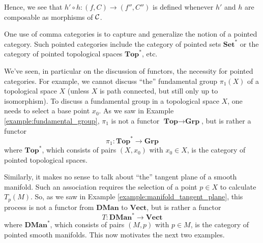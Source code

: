    Hence, we see that $h' \circ h :(f, C) \to (f'', C'')$ is
    defined whenever $h'$ and $h$ are composable as morphisms of
    $\mathcal{C}$.

    One use of comma categories is to capture and generalize 
    the notion of a pointed category.
    Such pointed categories include
    the category of pointed sets $\textbf{Set}^*$ or the category of pointed 
    topological spaces $\textbf{Top}^*$, etc. 

    We've seen, in particular on the discussion of functors, the necessity for 
    pointed categories. For example, we cannot discuss ``the'' fundamental 
    group $\pi_1(X)$ of a topological space $X$ (unless $X$ is path connected, but still only 
    up to isomorphism). To discuss
    a fundamental group in a topological space $X$, one needs to select a base point $x_0$. 
    As we saw in Example \ref{example:fundamental_group}, 
    $\pi_1$ is not a functor $\textbf{Top} \to \textbf{Grp}$, but is rather a 
    functor 
    \[
        \pi_1: \textbf{Top}^* \to \textbf{Grp}
    \]
    where $\textbf{Top}^*$, which consists of pairs $(X, x_0)$ with $x_0 \in X$,
    is the category of pointed topological spaces.

    Similarly, it makes no sense to talk about ``the'' tangent plane of 
    a smooth manifold. Such an association requires the selection of a point $p \in X$
    to calculate $T_p(M)$. 
    So, as we saw in Example \ref{example:manifold_tangent_plane}, this process is not 
    a functor from $\textbf{DMan}$ to $\textbf{Vect}$, but is rather a functor 
    \[
        T: \textbf{DMan}^* \to \textbf{Vect}
    \]
    where $\textbf{DMan}^*$, which consists of pairs $(M, p)$ with $p \in M$,
    is the category of pointed smooth manifolds. This now motivates the next two examples.

